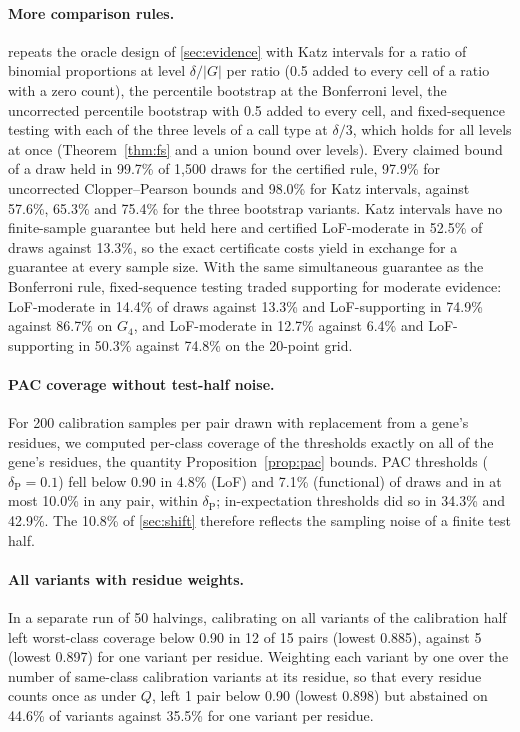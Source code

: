 \paragraph{More comparison rules.}  repeats the oracle design of \cref{sec:evidence} with Katz
intervals for a ratio of binomial proportions \cite{Katz1978} at level $\delta/|G|$ per ratio (0.5 added to every cell
of a ratio with a zero count), the percentile bootstrap at the Bonferroni level, the uncorrected percentile bootstrap with 0.5 added to every cell, and
fixed-sequence testing with each of the three levels of a call type at $\delta/3$, which holds for all levels at once
(Theorem~\ref{thm:fs} and a union bound over levels). Every claimed bound of a draw held in 99.7\% of 1,500 draws for
the certified rule, 97.9\% for uncorrected Clopper--Pearson bounds and 98.0\% for Katz intervals, against 57.6\%,
65.3\% and 75.4\% for the three bootstrap variants. Katz intervals have no finite-sample guarantee but held here and
certified LoF-moderate in 52.5\% of draws against 13.3\%, so the exact certificate costs yield in exchange for a
guarantee at every sample size. With the same simultaneous guarantee as the Bonferroni rule, fixed-sequence testing
traded supporting for moderate evidence: LoF-moderate in 14.4\% of draws against 13.3\% and LoF-supporting in 74.9\%
against 86.7\% on $G_4$, and LoF-moderate in 12.7\% against 6.4\% and LoF-supporting in 50.3\% against 74.8\% on the
20-point grid.



\paragraph{PAC coverage without test-half noise.} For 200 calibration samples per pair drawn with replacement from a
gene's residues, we computed per-class coverage of the thresholds exactly on all of the gene's residues, the quantity
Proposition~\ref{prop:pac} bounds. PAC thresholds ($\delta_{\mathrm P}=0.1$) fell below 0.90 in 4.8\% (LoF) and 7.1\%
(functional) of draws and in at most 10.0\% in any pair, within $\delta_{\mathrm P}$; in-expectation thresholds did so in
34.3\% and 42.9\%. The 10.8\% of \cref{sec:shift} therefore reflects the sampling noise of a finite test half.

\paragraph{All variants with residue weights.} In a separate run of 50 halvings, calibrating on all variants of the
calibration half left worst-class coverage below 0.90 in 12 of 15 pairs (lowest 0.885), against 5 (lowest 0.897) for
one variant per residue. Weighting each variant by one over the number of same-class calibration variants at its
residue, so that every residue counts once as under $Q$, left 1 pair below 0.90 (lowest 0.898) but abstained on 44.6\%
of variants against 35.5\% for one variant per residue.

